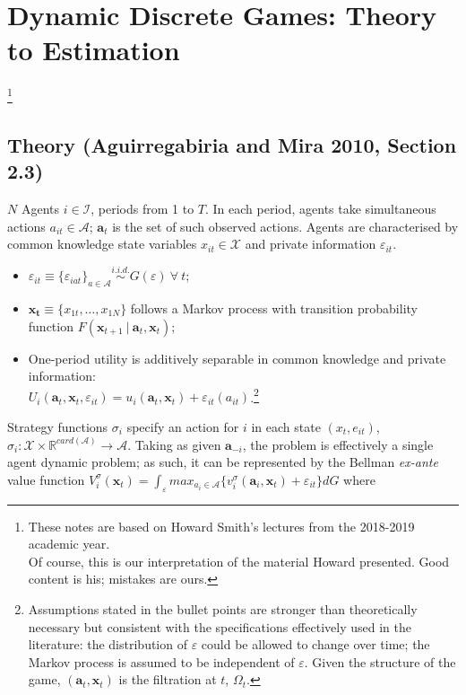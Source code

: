 \documentclass[11pt]{article}
\newcommand\blfootnote[1]{%
	\begingroup
	\renewcommand\thefootnote{}\footnote{#1}%
	\addtocounter{footnote}{-1}%
	\endgroup
}
\begin{document}
\onehalfspacing

\section{Dynamic Discrete Games: Theory to Estimation}

\blfootnote{These notes are based on Howard Smith's lectures from the 2018-2019 academic year.\\
Of course, this is our interpretation of the material Howard presented. Good content is his; mistakes are ours.}

\vspace{-1cm}

\subsection{Theory (Aguirregabiria and Mira 2010, Section 2.3)}
$N$ Agents $i \in \mathscr{I}$, periods from 1 to $T$. In each period, agents take simultaneous actions $a_{it} \in \mathscr{A}$; $\mathbf{a}_t$ is the set of such observed actions. Agents are characterised by common knowledge state variables $x_{it} \in \mathscr{X}$ and private information $\varepsilon_{it}$.
\begin{itemize}
	\item $\varepsilon_{it} \equiv \{\varepsilon_{iat}\}_{a \in \mathscr{A}} \overset{i.i.d.}{\sim} G(\varepsilon) ~\forall~ t$;
	\item $\mathbf{x_t} \equiv \{x_{1t}, \dots, x_{1N}\}$ follows a Markov process with transition probability function $F(\mathbf{x}_{t + 1} ~|~ \mathbf{a}_t, \mathbf{x}_t)$;
	\item One-period utility is additively separable in common knowledge and private information: \\
	$U_i(\mathbf{a}_t, \mathbf{x}_t, \varepsilon_{it}) = u_i(\mathbf{a}_t, \mathbf{x}_t) + \varepsilon_{it}(a_{it})$.\footnote{Assumptions stated in the bullet points are stronger than theoretically necessary but consistent with the specifications effectively used in the literature: the distribution of $\varepsilon$ could be allowed to change over time; the Markov process is assumed to be independent of $\varepsilon$. Given the structure of the game, $(\mathbf{a}_t, \mathbf{x}_t)$ is the filtration at $t$, $\Omega_t$.}
\end{itemize}
Strategy functions $\sigma_i$ specify an action for $i$ in each state $(x_t, e_{it})$, $\sigma_i : \mathscr{X} \times \mathbb{R}^{card(\mathscr{A})} \rightarrow \mathscr{A}$.
Taking as given $\mathbf{a}_{-i}$, the problem is effectively a single agent dynamic problem; as such, it can be represented by the Bellman \textit{ex-ante} value function $V^\sigma_i(\mathbf{x}_t) = \int_\varepsilon max_{a_i \in \mathscr{A}}\{v^\sigma_i(\mathbf{a}_i, \mathbf{x}_t) + \varepsilon_{it}\}dG$ where
\end{document}
